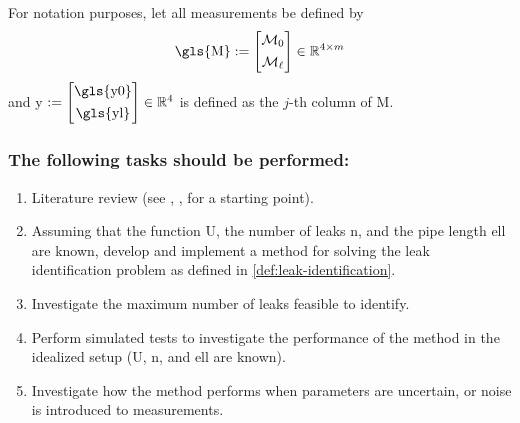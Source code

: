 For notation purposes, let all measurements be defined by
\[
\text{\gls{M}}
:=
\begin{bmatrix}
\mathcal{M}_0 \\[0.4em] 
\mathcal{M}_{\ell}
\end{bmatrix} \in\mathbb{R}^{4\times m} 
\]
and \gls{y} $:=\begin{bmatrix}
    \text{\gls{y0}} \\[0.4em]
    \text{\gls{yl}}
\end{bmatrix} \in \mathbb{R}^4$ is defined as the $j$-th column of \gls{M}.\\

\begin{samepage}
\subsubsection*{The following tasks should be performed:}
\begin{enumerate}
    \item Literature review (see \cite{peralta2023}, \cite{molno2024parallel}, \cite{molno2024conditions} for a starting point). \\

    \item Assuming that the function \gls{U}, the number of leaks \gls{n}, and the pipe length \gls{ell} are known, develop and implement a method for solving the leak identification problem as defined in \autoref{def:leak-identification}.\\

    \item Investigate the maximum number of leaks feasible to identify.\\
    
    \item Perform simulated tests to investigate the performance of the method in the idealized setup (\gls{U}, \gls{n}, and \gls{ell} are known).\\

    \item Investigate how the method performs when parameters are uncertain, or noise is introduced to measurements.\\
\end{enumerate}
\end{samepage}